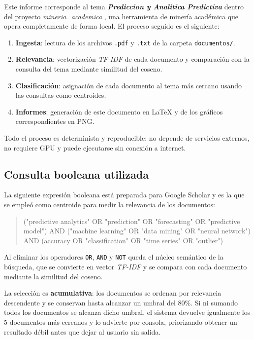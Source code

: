 \documentclass[11pt,a4paper]{article}
\newcommand{\tema}[1]{\textbf{\textit{#1}}}
\newcommand{\pcento}{\%}
\begin{document}
Este informe corresponde al tema \tema{ Prediccion y Analitica Predictiva } dentro del
proyecto \textit{ mineria\_academica }, una herramienta de minería académica que
opera completamente de forma local. El proceso seguido es el siguiente:

\begin{enumerate}
  \item \textbf{Ingesta}: lectura de los archivos \texttt{.pdf} y
        \texttt{.txt} de la carpeta \texttt{documentos/}.
  \item \textbf{Relevancia}: vectorización \textit{TF-IDF} de cada documento
        y comparación con la consulta del tema mediante similitud del coseno.
  \item \textbf{Clasificación}: asignación de cada documento al tema más
        cercano usando las consultas como centroides.
  \item \textbf{Informes}: generación de este documento en \LaTeX{} y de los
        gráficos correspondientes en PNG.
\end{enumerate}

Todo el proceso es determinista y reproducible: no depende de servicios
externos, no requiere GPU y puede ejecutarse sin conexión a internet.

\subsection{Consulta booleana utilizada}
\label{sec:query}

La siguiente expresión booleana está preparada para Google Scholar y es la que
se empleó como centroide para medir la relevancia de los documentos:

\begin{quote}
\small\ttfamily
("predictive analytics" OR "prediction" OR "forecasting" OR "predictive model") AND ("machine learning" OR "data mining" OR "neural network") AND (accuracy OR "classification" OR "time series" OR "outlier")
\end{quote}

Al eliminar los operadores \texttt{OR}, \texttt{AND} y \texttt{NOT} queda el
núcleo semántico de la búsqueda, que se convierte en vector \textit{TF-IDF} y
se compara con cada documento mediante la similitud del coseno.

La selección es \textbf{acumulativa}: los documentos se ordenan por relevancia
descendente y se conservan hasta alcanzar un umbral del
80\pcento. Si ni sumando todos los documentos se alcanza
dicho umbral, el sistema devuelve igualmente los 5
documentos más cercanos y lo advierte por consola, priorizando obtener un
resultado débil antes que dejar al usuario sin salida.
\end{document}
